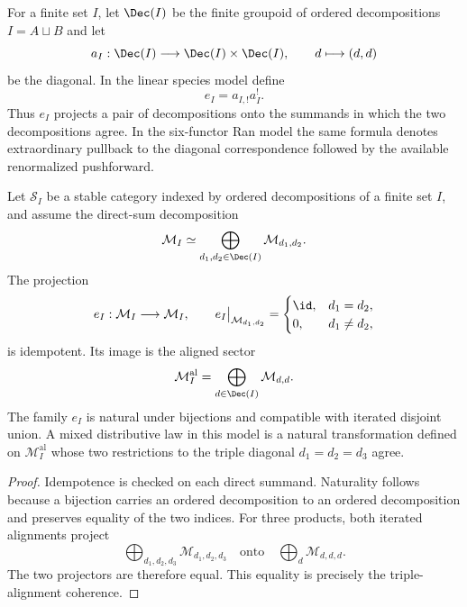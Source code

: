 \begin{definition}
For a finite set $I$, let $\Dec(I)$ be the finite groupoid of ordered decompositions $I=A\sqcup B$ and let
\[
 a_I:\Dec(I)\longrightarrow\Dec(I)\times\Dec(I),\qquad d\longmapsto(d,d)
\]
be the diagonal.  In the linear species model define
\[
 e_I=a_{I,!}a_I^!.
\]
Thus $e_I$ projects a pair of decompositions onto the summands in which the two decompositions agree.  In the six-functor Ran model the same formula denotes extraordinary pullback to the diagonal correspondence followed by the available renormalized pushforward.
\end{definition}

\begin{theorem}
Let $\mathcal S_I$ be a stable category indexed by ordered decompositions of a finite set $I$, and assume the direct-sum decomposition
\[
 \mathcal M_I\simeq\bigoplus_{d_1,d_2\in\Dec(I)}\mathcal M_{d_1,d_2}.
\]
The projection
\[
 e_I:\mathcal M_I\longrightarrow\mathcal M_I,
 \qquad
 e_I\big|_{\mathcal M_{d_1,d_2}}=
 \begin{cases}\id,&d_1=d_2,\\0,&d_1\ne d_2,
 \end{cases}
\]
is idempotent.  Its image is the aligned sector
\[
 \mathcal M_I^{\mathrm{al}}
 =\bigoplus_{d\in\Dec(I)}\mathcal M_{d,d}.
\]
The family $e_I$ is natural under bijections and compatible with iterated disjoint union.  A mixed distributive law in this model is a natural transformation defined on $\mathcal M_I^{\mathrm{al}}$ whose two restrictions to the triple diagonal $d_1=d_2=d_3$ agree.
\end{theorem}
\begin{proof}
Idempotence is checked on each direct summand.  Naturality follows because a bijection carries an ordered decomposition to an ordered decomposition and preserves equality of the two indices.  For three products, both iterated alignments project
\[
 \bigoplus_{d_1,d_2,d_3}\mathcal M_{d_1,d_2,d_3}
 \quad\text{onto}\quad
 \bigoplus_d\mathcal M_{d,d,d}.
\]
The two projectors are therefore equal.  This equality is precisely the triple-alignment coherence.
\end{proof}


